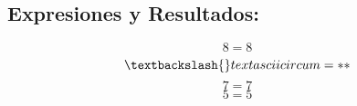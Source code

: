 \documentclass{article}%
\begin{document}
%
\normalsize%
\subsection{Expresiones y Resultados:}%
\label{subsec:ExpresionesyResultados}%
\[%
8 = 8%
\]%
\[%
\textbackslash{}textasciicircum = **%
\]%
\[%
7 = 7%
\]%
\[%
5 = 5%
\]

%
\end{document}
